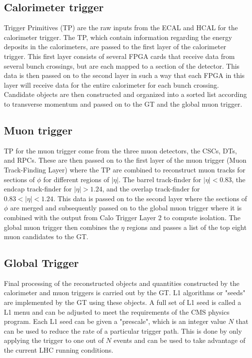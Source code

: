 \subsection{Calorimeter trigger}
Trigger Primitives (TP) are the raw inputs from the ECAL and HCAL for the calorimeter trigger.  The TP, which contain information regarding the energy deposits in the calorimeters, are passed to the first layer of the calorimeter trigger.  This first layer consists of several FPGA cards that receive data from several bunch crossings, but are each mapped to a section of the detector.  This data is then passed on to the second layer in such a way that each FPGA in this layer will receive data for the entire calorimeter for each bunch crossing.  Candidate objects are then constructed and organized into a sorted list according to transverse momentum and passed on to the GT and the global muon trigger.


\subsection{Muon trigger}
TP for the muon trigger come from the three muon detectors, the CSCs, DTs, and RPCs.  These are then passed on to the first layer of the muon trigger (Muon Track-Finding Layer) where the TP are combined to reconstruct muon tracks for sections of $\phi$ for different regions of $|\eta|$.  The barrel track-finder for $|\eta|<0.83$, the endcap track-finder for $|\eta|>1.24$, and the overlap track-finder for $0.83<|\eta|<1.24$.  This data is passed on to the second layer where the sections of $\phi$ are merged and subsequently passed on to the global muon trigger where it is combined with the output from Calo Trigger Layer 2 to compute isolation.  The global muon trigger then combines the $\eta$ regions and passes a list of the top eight muon candidates to the GT.

\subsection{Global Trigger}
Final processing of the reconstructed objects and quantities constructed by the calorimeter and muon triggers is carried out by the GT.  L1 algorithms or "seeds" are implemented by the GT using these objects.  A full set of L1 seed is called a L1 menu and can be adjusted to meet the requirements of the CMS physics program.  Each L1 seed can be given a "prescale", which is an integer value $N$ that can be used to reduce the rate of a particular trigger path.  This is done by only applying the trigger to one out of $N$ events and can be used to take advantage of the current LHC running conditions.

